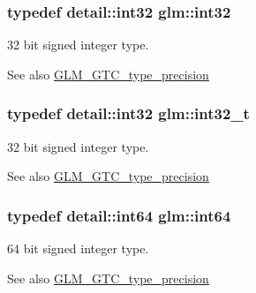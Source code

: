 \subsubsection[{int32}]{\setlength{\rightskip}{0pt plus 5cm}typedef detail\+::int32 {\bf glm\+::int32}}\label{group__gtc__type__precision_ga632d8b25f6b61659f39ea4321fab92a4}
32 bit signed integer type. \begin{DoxySeeAlso}{See also}
\hyperlink{group__gtc__type__precision}{G\+L\+M\+\_\+\+G\+T\+C\+\_\+type\+\_\+precision} 
\end{DoxySeeAlso}
\hypertarget{group__gtc__type__precision_gab870c0eb6f525b0c8c4716762e0fc3a8}{}
\subsubsection[{int32\+\_\+t}]{\setlength{\rightskip}{0pt plus 5cm}typedef {\bf detail\+::int32} {\bf glm\+::int32\+\_\+t}}\label{group__gtc__type__precision_gab870c0eb6f525b0c8c4716762e0fc3a8}
32 bit signed integer type. \begin{DoxySeeAlso}{See also}
\hyperlink{group__gtc__type__precision}{G\+L\+M\+\_\+\+G\+T\+C\+\_\+type\+\_\+precision} 
\end{DoxySeeAlso}
\hypertarget{group__gtc__type__precision_ga435d75819cce297cc5fa21bd84ef89a5}{}
\subsubsection[{int64}]{\setlength{\rightskip}{0pt plus 5cm}typedef detail\+::int64 {\bf glm\+::int64}}\label{group__gtc__type__precision_ga435d75819cce297cc5fa21bd84ef89a5}
64 bit signed integer type. \begin{DoxySeeAlso}{See also}
\hyperlink{group__gtc__type__precision}{G\+L\+M\+\_\+\+G\+T\+C\+\_\+type\+\_\+precision} 
\end{DoxySeeAlso}
\hypertarget{group__gtc__type__precision_ga6abb23fbf4e39c50ec5341160b5da5ab}{}
